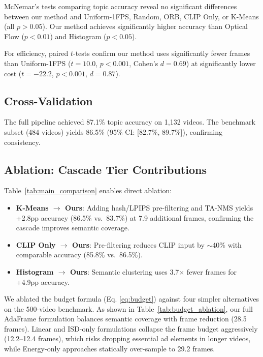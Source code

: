 \documentclass[sigconf,nonacm]{acmart}
\begin{document}
McNemar's tests comparing topic accuracy reveal no significant differences between our method and Uniform-1FPS, Random, ORB, CLIP Only, or K-Means (all $p > 0.05$). Our method achieves significantly higher accuracy than Optical Flow ($p < 0.01$) and Histogram ($p < 0.05$).

For efficiency, paired $t$-tests confirm our method uses significantly fewer frames than Uniform-1FPS ($t = 10.0$, $p < 0.001$, Cohen's $d = 0.69$) at significantly lower cost ($t = -22.2$, $p < 0.001$, $d = 0.87$).

\subsection{Cross-Validation}
\label{sec:full_pipeline}

The full pipeline achieved 87.1\% topic accuracy on 1,132 videos. The benchmark subset (484 videos) yields 86.5\% (95\% CI: [82.7\%, 89.7\%]), confirming consistency.

\subsection{Ablation: Cascade Tier Contributions}

Table~\ref{tab:main_comparison} enables direct ablation:
\begin{itemize}
    \item \textbf{K-Means $\rightarrow$ Ours}: Adding hash/LPIPS pre-filtering and TA-NMS yields +2.8pp accuracy (86.5\% vs.\ 83.7\%) at 7.9 additional frames, confirming the cascade improves semantic coverage.
    \item \textbf{CLIP Only $\rightarrow$ Ours}: Pre-filtering reduces CLIP input by $\sim$40\% with comparable accuracy (85.8\% vs.\ 86.5\%).
    \item \textbf{Histogram $\rightarrow$ Ours}: Semantic clustering uses 3.7$\times$ fewer frames for +4.9pp accuracy.
\end{itemize}

We ablated the budget formula (Eq. \ref{eq:budget}) against four simpler alternatives on the 500-video benchmark. As shown in Table~\ref{tab:budget_ablation}, our full AdaFrame formulation balances semantic coverage with frame reduction (28.5 frames). Linear and ISD-only formulations collapse the frame budget aggressively (12.2--12.4 frames), which risks dropping essential ad elements in longer videos, while Energy-only approaches statically over-sample to 29.2 frames.
\end{document}
